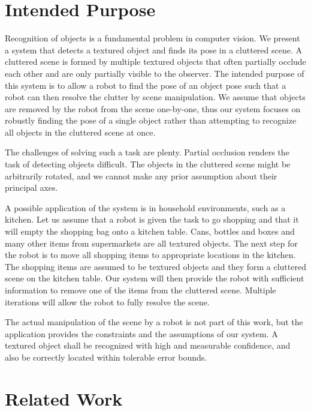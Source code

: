 
\section{Intended Purpose}

Recognition of objects is a fundamental problem in computer vision. We present
a system that detects a textured object and finds its pose in a cluttered
scene. A cluttered scene is formed by multiple textured objects that often
partially occlude each other and are only partially visible to the observer.
The intended purpose of this system is to allow a robot to find the pose of an
object pose such that a robot can then resolve the clutter by scene
manipulation. We assume that objects are removed by the robot from the scene
one-by-one, thus our system focuses on robustly finding the pose of a single
object rather than attempting to recognize all objects in the cluttered scene
at once.

The challenges of solving such a task are plenty. Partial occlusion renders the 
task of detecting objects difficult. The objects in the cluttered scene might
be arbitrarily rotated, and we cannot make any prior assumption about their
principal axes.

A possible application of the system is in household environments, such as a
kitchen.  Let us assume that a robot is given the task to go shopping and that
it will empty the shopping bag onto a kitchen table. Cans, bottles and boxes
and many other items from supermarkets are all textured objects. The next step
for the robot is to move all shopping items to appropriate locations in the
kitchen. The shopping items are assumed to be textured objects and they form a
cluttered scene on the kitchen table. Our system will then provide the robot
with sufficient information to remove one of the items from the cluttered
scene. Multiple iterations will allow the robot to fully resolve the scene.

The actual manipulation of the scene by a robot is not part of this work, but
the application provides the constraints and the assumptions of our system. A
textured object shall be recognized with high and measurable confidence, and
also be correctly located within tolerable error bounds.

\section{Related Work}

